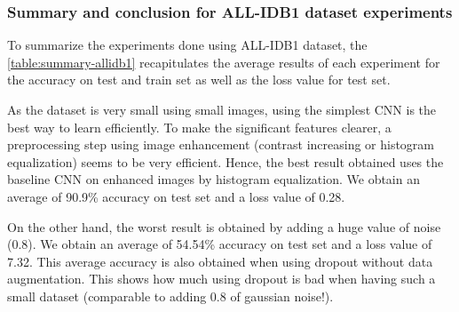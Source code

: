 \documentclass[11pt, openany]{report}
\theoremstyle{plain}
\theoremstyle{definition}
\theoremstyle{remark}
\begin{document}
\newpage
\subsubsection{Summary and conclusion for ALL-IDB1 dataset experiments}
To summarize the experiments done using ALL-IDB1 dataset, the \autoref{table:summary-allidb1} recapitulates the average results of each experiment for the accuracy on test and train set as well as the loss value for test set. 

As the dataset is very small using small images, using the simplest CNN is the best way to learn efficiently. To make the significant features clearer, a preprocessing step using image enhancement (contrast increasing or histogram equalization) seems to be very efficient. Hence, the best result obtained uses the baseline CNN on enhanced images by histogram equalization. We obtain an average of 90.9\% accuracy on test set and a loss value of 0.28. 

On the other hand, the worst result is obtained by adding a huge value of noise (0.8). We obtain an average of 54.54\% accuracy on test set and a loss value of 7.32. This average accuracy is also obtained when using dropout without data augmentation. This shows how much using dropout is bad when having such a small dataset (comparable to adding 0.8 of gaussian noise!).  
\end{document}
